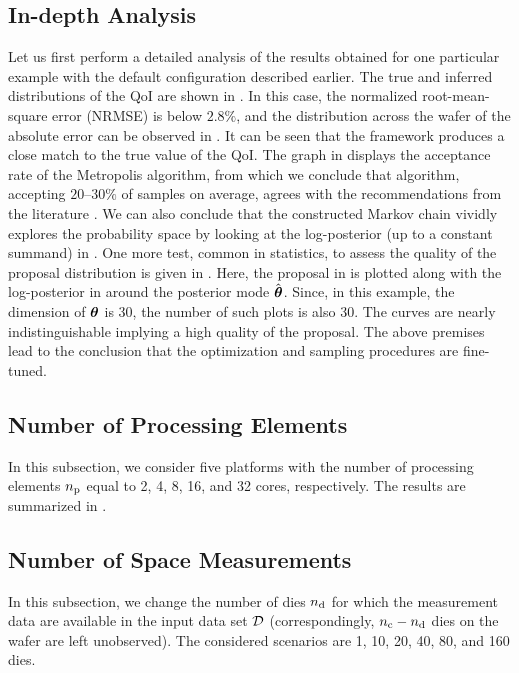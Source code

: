 \subsection{In-depth Analysis}



Let us first perform a detailed analysis of the results obtained for one particular example with the default configuration described earlier. The true and inferred distributions of the QoI are shown in . In this case, the normalized root-mean-square error (NRMSE) is below $2.8\%$, and the distribution across the wafer of the absolute error can be observed in . It can be seen that the framework produces a close match to the true value of the QoI. The graph in  displays the acceptance rate of the Metropolis algorithm, from which we conclude that algorithm, accepting $20$--$30\%$ of samples on average, agrees with the recommendations from the literature \cite{gelman2004}. We can also conclude that the constructed Markov chain vividly explores the probability space by looking at the log-posterior (up to a constant summand) in . One more test, common in statistics, to assess the quality of the proposal distribution is given in . Here, the proposal in  is plotted along with the log-posterior in  around the posterior mode $\hat{{\boldsymbol\theta}}$. Since, in this example, the dimension of ${\boldsymbol\theta}$ is 30, the number of such plots is also 30. The curves are nearly indistinguishable implying a high quality of the proposal. The above premises lead to the conclusion that the optimization and sampling procedures are fine-tuned.

\subsection{Number of Processing Elements}
In this subsection, we consider five platforms with the number of processing elements ${n_\text{p}}$ equal to 2, 4, 8, 16, and 32 cores, respectively. The results are summarized in .


\subsection{Number of Space Measurements}
In this subsection, we change the number of dies ${n_{\text{d}}}$ for which the measurement data are available in the input data set $\mathcal{D}$ (correspondingly, ${n_{\text{c}}} - {n_{\text{d}}}$ dies on the wafer are left unobserved). The considered scenarios are 1, 10, 20, 40, 80, and 160 dies.

